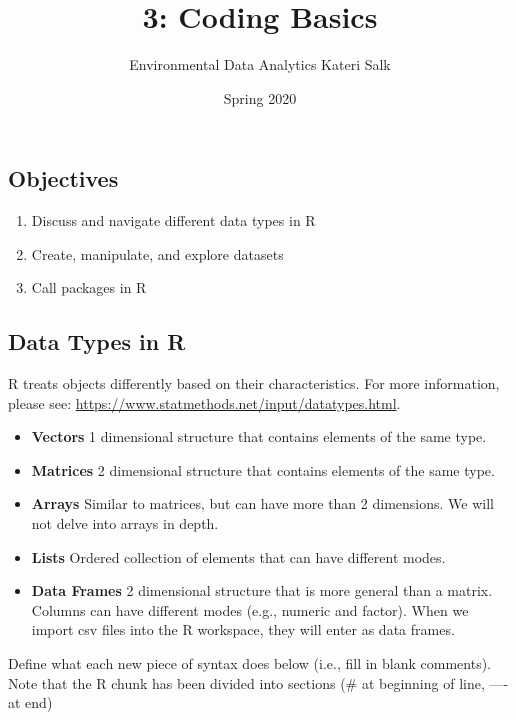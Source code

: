 \documentclass[]{article}
\title{3: Coding Basics}
\author{Environmental Data Analytics \textbar{} Kateri Salk}
\date{Spring 2020}
\providecommand{\tightlist}{%
  \setlength{\itemsep}{0pt}\setlength{\parskip}{0pt}}
\begin{document}
\maketitle

\hypertarget{objectives}{%
\subsection{Objectives}\label{objectives}}

\begin{enumerate}
\def\labelenumi{\arabic{enumi}.}
\tightlist
\item
  Discuss and navigate different data types in R
\item
  Create, manipulate, and explore datasets
\item
  Call packages in R
\end{enumerate}

\hypertarget{data-types-in-r}{%
\subsection{Data Types in R}\label{data-types-in-r}}

R treats objects differently based on their characteristics. For more
information, please see:
\url{https://www.statmethods.net/input/datatypes.html}.

\begin{itemize}
\item
  \textbf{Vectors} 1 dimensional structure that contains elements of the
  same type.
\item
  \textbf{Matrices} 2 dimensional structure that contains elements of
  the same type.
\item
  \textbf{Arrays} Similar to matrices, but can have more than 2
  dimensions. We will not delve into arrays in depth.
\item
  \textbf{Lists} Ordered collection of elements that can have different
  modes.
\item
  \textbf{Data Frames} 2 dimensional structure that is more general than
  a matrix. Columns can have different modes (e.g., numeric and factor).
  When we import csv files into the R workspace, they will enter as data
  frames.
\end{itemize}

Define what each new piece of syntax does below (i.e., fill in blank
comments). Note that the R chunk has been divided into sections (\# at
beginning of line, ---- at end)
\end{document}
